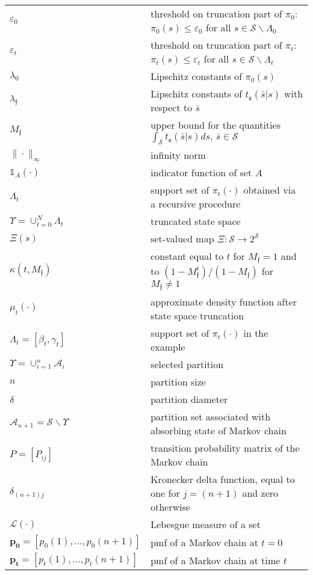 \documentclass{LMCS}
\begin{document}
\begin{longtable}{lp{10.5cm}}
$\varepsilon_0$ & threshold on truncation part of $\pi_0$: $\pi_0(s)\le\varepsilon_0$ for all $s\in\mathcal S\backslash\Lambda_0$\\
$\varepsilon_t$ & threshold on truncation part of $\pi_t$: 
$\pi_t(s)\le \varepsilon_t$ for all $s\in\mathcal S\backslash\Lambda_t$\\
$\lambda_0$& Lipschitz constants of $\pi_0(s)$\\
$\lambda_{\mathfrak f}$& Lipschitz constants of $t_{\mathfrak s}(\bar s|s)$ with respect to $\bar s$\\ 
$M_{\mathfrak f}$ & upper bound for the quantities $\int_{\mathcal S}t_{\mathfrak s}(\bar s|s)ds,\, \bar s\in\mathcal S$\\
$\|\cdot\|_{\infty}$ & infinity norm\\
$\mathds 1_A(\cdot)$ & indicator function of set $A$\\
$\Lambda_t$ & support set of $\pi_t(\cdot)$ obtained via a recursive procedure\\
$\Upsilon = \cup_{t=0}^N\Lambda_t$ & truncated state space\\
$\varXi(s)$ & set-valued map $\varXi:\mathcal S\rightarrow 2^{\mathcal S}$\\
$\kappa(t,M_{\mathfrak f})$ & constant equal to $t$ for $M_{\mathfrak f} = 1$ and to $(1-M_{\mathfrak f}^t)/(1-M_{\mathfrak f})$ for $M_{\mathfrak f}\ne 1$\\
$\mu_t(\cdot)$ & approximate density function after state space truncation\\
$\Lambda_t = [\beta_t,\gamma_t]$ & support set of $\pi_t(\cdot)$ in the example\\
$\Upsilon = \cup_{i=1}^n \mathcal A_i$ & selected partition\\
$n$ & partition size\\
$\delta$ & partition diameter\\
$\mathcal A_{n+1} = \mathcal S\backslash\Upsilon$ & partition set associated with absorbing state of Markov chain\\
$P = [P_{ij}]$ & transition probability matrix of the Markov chain\\
$\delta_{(n+1)j}$ & Kronecker delta function, equal to one for $j = (n+1)$ and zero otherwise\\
$\mathcal L(\cdot)$ & Lebesgue measure of a set\\
$\mathbf{p_0} = [p_0(1),\ldots,p_0(n+1)]$ & pmf of a Markov chain at $t=0$\\
$\mathbf{p_t} = [p_t(1),\ldots,p_t(n+1)]$ & pmf of a Markov chain at time $t$\\

\end{longtable}
\end{document}
